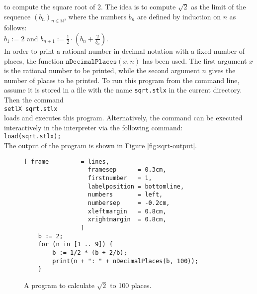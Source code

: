 to compute the square root of $2$.  The idea is to compute $\sqrt{2}$ as the limit of the sequence $(b_n)_{n\in\mathbb{N}}$, 
where the numbers $b_n$ are defined by induction on $n$  as follows:
\\[0.2cm]
\hspace*{1.3cm}
$b_1 := 2$ \quad and \quad $\displaystyle b_{n+1} := \frac{1}{2} \cdot \left(b_n + \frac{2}{b_n}\right)$.
\\[0.2cm]
In order to print a rational number in decimal notation with a fixed number of places, the function
$\texttt{nDecimalPlaces}(x,n)$ has been used.  The first argument $x$ is the rational number to be
printed, while the second argument $n$ gives the number of places to be printed.  To run this
program from the command line, assume it is stored in a file with the name \texttt{sqrt.stlx} in the
current directory.  Then the command
\\[0.2cm]
\hspace*{1.3cm}
\texttt{setlX sqrt.stlx}
\\[0.2cm]
loads and executes this program.  Alternatively, the command can be executed interactively in the
interpreter via the following command:
\\[0.2cm]
\hspace*{1.3cm}
\texttt{load(sqrt.stlx);}
\\[0.2cm]
The output of the program is shown in Figure \ref{fig:sqrt-output}.

\begin{figure}[!ht]
\centering
\begin{Verbatim}[ frame         = lines, 
                  framesep      = 0.3cm, 
                  firstnumber   = 1,
                  labelposition = bottomline,
                  numbers       = left,
                  numbersep     = -0.2cm,
                  xleftmargin   = 0.8cm,
                  xrightmargin  = 0.8cm,
                ]
    b := 2;
    for (n in [1 .. 9]) {
        b := 1/2 * (b + 2/b);
        print(n + ": " + nDecimalPlaces(b, 100));
    }
\end{Verbatim}
\vspace*{-0.3cm}
\caption{A program to calculate $\sqrt{2}$ to 100 places.}
\label{fig:sqrt.stlx}
\end{figure}


